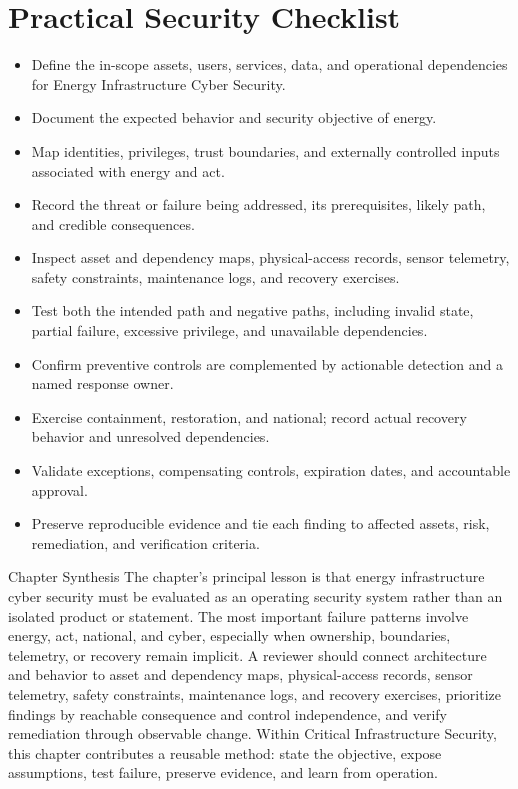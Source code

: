 \documentclass[11pt,letterpaper]{article}
\begin{document}
\section*{Practical Security Checklist}
\begin{itemize}[label=$\square$]
\item Define the in-scope assets, users, services, data, and operational dependencies for Energy Infrastructure Cyber Security.
\item Document the expected behavior and security objective of energy.
\item Map identities, privileges, trust boundaries, and externally controlled inputs associated with energy and act.
\item Record the threat or failure being addressed, its prerequisites, likely path, and credible consequences.
\item Inspect asset and dependency maps, physical-access records, sensor telemetry, safety constraints, maintenance logs, and recovery exercises.
\item Test both the intended path and negative paths, including invalid state, partial failure, excessive privilege, and unavailable dependencies.
\item Confirm preventive controls are complemented by actionable detection and a named response owner.
\item Exercise containment, restoration, and national; record actual recovery behavior and unresolved dependencies.
\item Validate exceptions, compensating controls, expiration dates, and accountable approval.
\item Preserve reproducible evidence and tie each finding to affected assets, risk, remediation, and verification criteria.
\end{itemize}
\begin{CornellSummaryBox}{Chapter Synthesis}
The chapter's principal lesson is that energy infrastructure cyber security must be evaluated as an operating security system rather than an isolated product or statement. The most important failure patterns involve energy, act, national, and cyber, especially when ownership, boundaries, telemetry, or recovery remain implicit. A reviewer should connect architecture and behavior to asset and dependency maps, physical-access records, sensor telemetry, safety constraints, maintenance logs, and recovery exercises, prioritize findings by reachable consequence and control independence, and verify remediation through observable change. Within Critical Infrastructure Security, this chapter contributes a reusable method: state the objective, expose assumptions, test failure, preserve evidence, and learn from operation.
\end{CornellSummaryBox}
\end{document}
